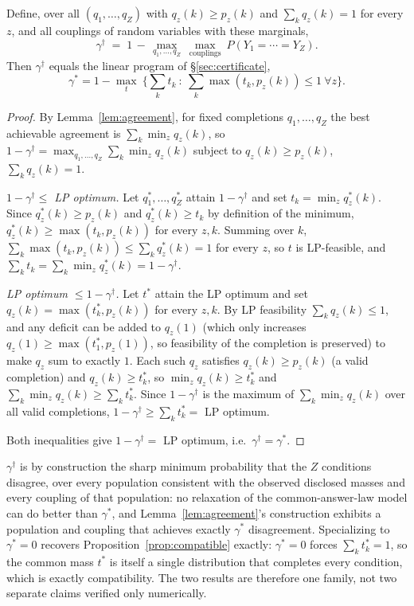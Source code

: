 \begin{proposition}
\label{prop:necessary}
Define, over all $(q_1,\dots,q_Z)$ with $q_z(k)\ge p_z(k)$ and
$\sum_k q_z(k)=1$ for every $z$, and all couplings of random variables with
these marginals,
\[
\gamma^\dagger \;=\; 1 \,-\, \max_{q_1,\dots,q_Z}\ \max_{\text{couplings}}\
P(Y_1=\cdots=Y_Z).
\]
Then $\gamma^\dagger$ equals the linear program of \S\ref{sec:certificate},
{\small
\[
\gamma^* = 1-\max_t\ \Big\{ \textstyle\sum_k t_k \ :\
\textstyle\sum_k\max(t_k,p_z(k))\le1\ \forall z \Big\} .
\]}
\end{proposition}
\begin{proof}
By Lemma~\ref{lem:agreement}, for fixed completions $q_1,\dots,q_Z$ the best
achievable agreement is $\sum_k\min_z q_z(k)$, so
$1-\gamma^\dagger=\max_{q_1,\dots,q_Z}\sum_k\min_z q_z(k)$ subject to
$q_z(k)\ge p_z(k)$, $\sum_k q_z(k)=1$.

\emph{$1-\gamma^\dagger \le$ LP optimum.} Let $q_1^*,\dots,q_Z^*$ attain
$1-\gamma^\dagger$ and set $t_k=\min_z q_z^*(k)$. Since $q_z^*(k)\ge p_z(k)$
and $q_z^*(k)\ge t_k$ by definition of the minimum, $q_z^*(k)\ge\max(t_k,
p_z(k))$ for every $z,k$. Summing over $k$, $\sum_k\max(t_k,p_z(k))\le
\sum_k q_z^*(k)=1$ for every $z$, so $t$ is LP-feasible, and $\sum_k t_k =
\sum_k\min_z q_z^*(k) = 1-\gamma^\dagger$.

\emph{LP optimum $\le 1-\gamma^\dagger$.} Let $t^*$ attain the LP optimum and
set $q_z(k)=\max(t_k^*,p_z(k))$ for every $z,k$. By LP feasibility $\sum_k
q_z(k)\le1$, and any deficit can be added to $q_z(1)$ (which only increases
$q_z(1)\ge\max(t_1^*,p_z(1))$, so feasibility of the completion is preserved)
to make $q_z$ sum to exactly $1$. Each such $q_z$ satisfies $q_z(k)\ge
p_z(k)$ (a valid completion) and $q_z(k)\ge t_k^*$, so $\min_z q_z(k)\ge
t_k^*$ and $\sum_k\min_z q_z(k)\ge\sum_k t_k^*$. Since $1-\gamma^\dagger$ is
the maximum of $\sum_k\min_z q_z(k)$ over all valid completions, $1-
\gamma^\dagger\ge\sum_k t_k^*=$ LP optimum.

Both inequalities give $1-\gamma^\dagger=$ LP optimum, i.e.\
$\gamma^\dagger=\gamma^*$.
\end{proof}

$\gamma^\dagger$ is by construction the sharp minimum probability that the
$Z$ conditions disagree, over every population consistent with the observed
disclosed masses and every coupling of that population: no relaxation of the
common-answer-law model can do better than $\gamma^*$, and
Lemma~\ref{lem:agreement}'s construction exhibits a population and coupling
that achieves exactly $\gamma^*$ disagreement. Specializing to $\gamma^*=0$
recovers Proposition~\ref{prop:compatible} exactly: $\gamma^*=0$ forces
$\sum_k t_k^*=1$, so the common mass $t^*$ is itself a single distribution
that completes every condition, which is exactly compatibility. The two
results are therefore one family, not two separate claims verified only
numerically.
